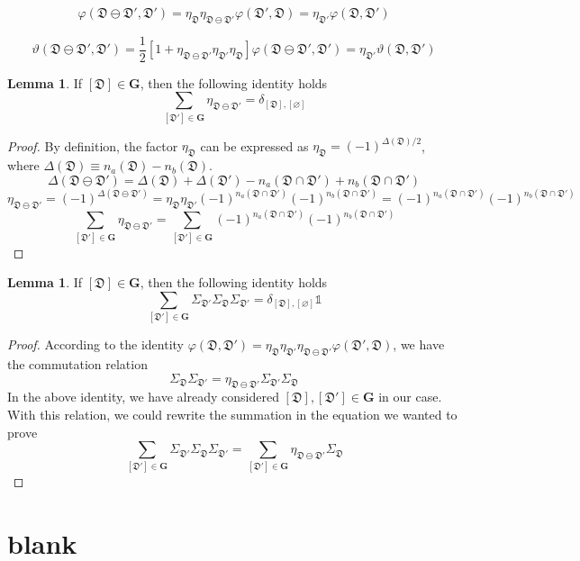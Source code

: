 \documentclass[12font]{article}
\theoremstyle{definition}
\newtheorem{lemma}[theorem]{Lemma}
\newcommand{\lrm}[1]{\left[  #1  \right]}
\newcommand{\abs}[1]{\left|  #1  \right|}
\newcommand{\mrm}[1]{\mathrm{#1}}
\newcommand{\bo}[1]{\mathbf{#1}}
\begin{document}
\[
\varphi(\mathfrak{D}\ominus\mathfrak{D}',\mathfrak{D}') = \eta_{\mathfrak{D}}\eta_{\mathfrak{D}\ominus\mathfrak{D}'} \varphi(\mathfrak{D}',\mathfrak{D})
=
\eta_{\mathfrak{D}'} \varphi(\mathfrak{D},\mathfrak{D}')
\]

\[
\vartheta(\mathfrak{D}\ominus\mathfrak{D}',\mathfrak{D}')
=
\frac{1}{2}
\lrm{
    1
    +
    \eta_{\mathfrak{D}\ominus\mathfrak{D}'}
    \eta_{\mathfrak{D}'}
    \eta_{\mathfrak{D}}
}
\varphi(\mathfrak{D}\ominus\mathfrak{D}',\mathfrak{D}') 
= 
\eta_{\mathfrak{D}'}
\vartheta(\mathfrak{D},\mathfrak{D}')
\]

\begin{lemma}
    If $[\mathfrak{D}]\in\bo{G}$, then the following identity holds
    \[
    \sum_{[\mathfrak{D}']\in\bo{G}}\eta_{\mathfrak{D}\ominus\mathfrak{D}'} 
    = 
    \delta_{[\mathfrak{D}],[\varnothing]}
    \]
\end{lemma}
\begin{proof}
    By definition, the factor $\eta_{\mathfrak{D}}$ can be expressed as $\eta_{\mathfrak{D}} = (-1)^{\Delta(\mathfrak{D})/2}$, where $\Delta(\mathfrak{D}) \equiv n_a(\mathfrak{D})-n_b(\mathfrak{D})$. 
    \[
    \Delta(\mathfrak{D}\ominus\mathfrak{D}') 
    = 
    \Delta(\mathfrak{D})
    +
    \Delta(\mathfrak{D}')
    - n_a(\mathfrak{D}\cap\mathfrak{D}') 
    + n_b(\mathfrak{D}\cap\mathfrak{D}') 
    \]
    \[
    \eta_{\mathfrak{D}\ominus\mathfrak{D}'}
    =
    (-1)^{\Delta(\mathfrak{D}\ominus\mathfrak{D}')}
    =
    \eta_{\mathfrak{D}}\eta_{\mathfrak{D}'}
    (-1)^{n_a(\mathfrak{D}\cap\mathfrak{D}') }(-1)^{n_b(\mathfrak{D}\cap\mathfrak{D}')}
    =
    (-1)^{n_a(\mathfrak{D}\cap\mathfrak{D}') }(-1)^{n_b(\mathfrak{D}\cap\mathfrak{D}')}
    \]
    \[
    \sum_{[\mathfrak{D}']\in\bo{G}} \eta_{\mathfrak{D}\ominus\mathfrak{D}'}
    =
    \sum_{[\mathfrak{D}']\in\bo{G}}(-1)^{n_a(\mathfrak{D}\cap\mathfrak{D}') }(-1)^{n_b(\mathfrak{D}\cap\mathfrak{D}')}
    \]
\end{proof}
\begin{lemma}
    If $[\mathfrak{D}]\in\bo{G}$, then the following identity holds
    \[
    \sum_{[\mathfrak{D}']\in\bo{G}} \Sigma_{\mathfrak{D}'}\Sigma_{\mathfrak{D}}\Sigma_{\mathfrak{D}'} 
    = 
    \delta_{[\mathfrak{D}],[\varnothing]}
    \mathds{1}
    \]
\end{lemma}
\begin{proof}
    According to the identity $\varphi(\mathfrak{D},\mathfrak{D}') = \eta_{\mathfrak{D}}\eta_{\mathfrak{D}'}\eta_{\mathfrak{D}\ominus\mathfrak{D}'}\varphi(\mathfrak{D}',\mathfrak{D})$, we have the commutation relation 
    \[
    \Sigma_{\mathfrak{D}}\Sigma_{\mathfrak{D}'} = \eta_{\mathfrak{D}\ominus\mathfrak{D}'} \Sigma_{\mathfrak{D}'}\Sigma_{\mathfrak{D}}
    \]
    In the above identity, we have already considered $[\mathfrak{D}],[\mathfrak{D}']\in\bo{G}$ in our case. With this relation, we could rewrite the summation in the equation we wanted to prove
    \[
    \sum_{[\mathfrak{D}']\in\bo{G}} \Sigma_{\mathfrak{D}'}\Sigma_{\mathfrak{D}}\Sigma_{\mathfrak{D}'}
    =
    \sum_{[\mathfrak{D}']\in\bo{G}} 
    \eta_{\mathfrak{D}\ominus\mathfrak{D}'}
    \Sigma_{\mathfrak{D}}
    \]
\end{proof}

\section{blank}


\end{document}
